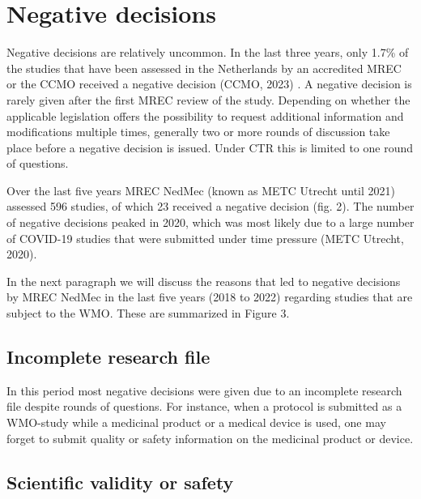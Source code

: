 \documentclass[authordate, meta, issue]{jote-new-article}
\begin{document}
\section{Negative decisions}



Negative decisions are relatively uncommon. In the last three years, only 1.7\% of the studies that have been assessed in the Netherlands by an accredited MREC or the CCMO received a negative decision (CCMO, 2023) . A negative decision is rarely given after the first MREC review of the study. Depending on whether the applicable legislation offers the possibility to request additional information and modifications multiple times, generally two or more rounds of discussion take place before a negative decision is issued. Under CTR this is limited to one round of questions.







Over the last five years MREC NedMec (known as METC Utrecht until 2021) assessed 596 studies, of which 23 received a negative decision (fig. 2). The number of negative decisions peaked in 2020, which was most likely due to a large number of COVID-19 studies that were submitted under time pressure (METC Utrecht, 2020).



In the next paragraph we will discuss the reasons that led to negative decisions by MREC NedMec in the last five years (2018 to 2022) regarding studies that are subject to the WMO. These are summarized in Figure 3.







\subsection{Incomplete research file}



In this period most negative decisions were given due to an incomplete research file despite rounds of questions. For instance, when a protocol is submitted as a WMO-study while a medicinal product or a medical device is used, one may forget to submit quality or safety information on the medicinal product or device.







\subsection{Scientific validity or safety}
\end{document}
